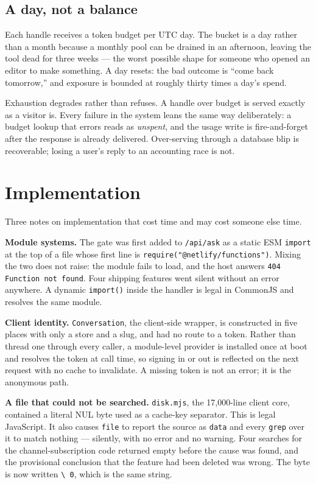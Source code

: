 \documentclass[10pt,letterpaper,twocolumn]{article}
\newcommand{\code}[1]{\texttt{#1}}
\begin{document}
\subsection{A day, not a balance}

Each handle receives a token budget per UTC day. The bucket is a day rather than
a month because a monthly pool can be drained in an afternoon, leaving the tool
dead for three weeks --- the worst possible shape for someone who opened an
editor to make something. A day resets: the bad outcome is ``come back
tomorrow,'' and exposure is bounded at roughly thirty times a day's spend.

Exhaustion degrades rather than refuses. A handle over budget is served exactly
as a visitor is. Every failure in the system leans the same way deliberately: a
budget lookup that errors reads as \emph{unspent}, and the usage write is
fire-and-forget after the response is already delivered. Over-serving through a
database blip is recoverable; losing a user's reply to an accounting race is not.

\section{Implementation}
\label{sec:impl}

Three notes on implementation that cost time and may cost someone else time.

\textbf{Module systems.} The gate was first added to \code{/api/ask} as a static
ESM \code{import} at the top of a file whose first line is
\code{require("@netlify/functions")}. Mixing the two does not raise: the module
fails to load, and the host answers \code{404 Function not found}. Four shipping
features went silent without an error anywhere. A dynamic \code{import()} inside
the handler is legal in CommonJS and resolves the same module.

\textbf{Client identity.} \code{Conversation}, the client-side wrapper, is
constructed in five places with only a store and a slug, and had no route to a
token. Rather than thread one through every caller, a module-level provider is
installed once at boot and resolves the token at call time, so signing in or out
is reflected on the next request with no cache to invalidate. A missing token is
not an error; it is the anonymous path.

\textbf{A file that could not be searched.} \code{disk.mjs}, the 17,000-line
client core, contained a literal NUL byte used as a cache-key separator. This is
legal JavaScript. It also causes \code{file} to report the source as
\code{data} and every \code{grep} over it to match nothing --- silently, with no
error and no warning. Four searches for the channel-subscription code returned
empty before the cause was found, and the provisional conclusion that the
feature had been deleted was wrong. The byte is now written \code{\textbackslash
0}, which is the same string.
\end{document}
